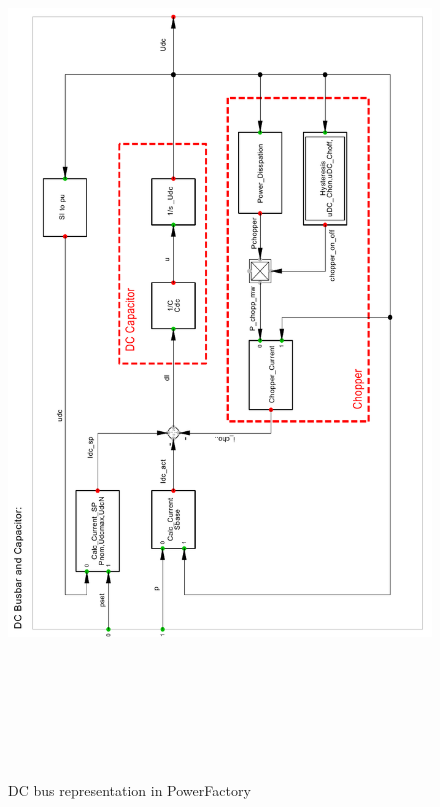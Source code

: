 \begin{figure}[H]
\centering
    \includegraphics[height = 24cm,width =\textwidth]{Diagrams/Appendix_A/DC_bus_PFD.pdf}
    \caption{DC bus representation in PowerFactory \cite{erlich_description_nodate}}
    \label{fig:DC_bus_PFD}
\end{figure}

